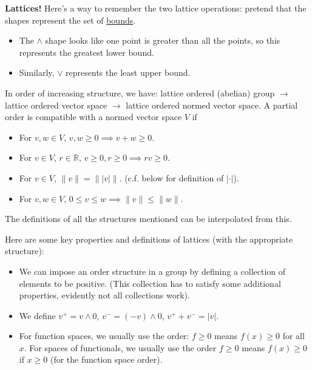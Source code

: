 \documentclass[12pt, letterpaper]{article}
\newcommand{\bR}{{\mathbb R}}
\begin{document}
\pagestyle{fancy}

\textbf{Lattices!} Here's a way to remember the two lattice operations: pretend that the shapes represent the set of \underline{bounds}.
\begin{itemize}
    \item
    The $\wedge$ shape looks like one point is greater than all the points, so this represents the greatest lower bound.

    \item
    Similarly, $\vee$ represents the least upper bound.

\end{itemize}
In order of increasing structure, we have: lattice ordered (abelian) group $ \rightarrow $ lattice ordered vector space $ \rightarrow $ lattice ordered normed vector space. A partial order is compatible with a normed vector space $V$ if
\begin{itemize}
    \item
    For $v,w \in V$, $v, w \geq 0 \implies v + w \geq 0$.
    
    \item
    For $v \in V$, $r \in \bR$, $v \geq 0, r \geq 0 \implies rv \geq 0$.

    \item
    For $v \in V$, $\|v\| = \| |v| \|$. (c.f. below for definition of $|\cdot|$).

    \item
    For $v,w \in V$, $0 \leq v \leq w \implies \|v\| \leq \|w\|$.
\end{itemize}
The definitions of all the structures mentioned can be interpolated from this.

Here are some key properties and definitions of lattices (with the appropriate structure):
\begin{itemize}
    \item
    We can impose an order structure in a group by defining a collection of elements to be positive. (This collection has to satisfy some additional properties, evidently not all collections work).

    \item
    We define $v^+ = v \wedge 0$, $v^- = (-v) \wedge 0$, $v^+ + v^- = |v|$.

    \item
    For function spaces, we usually use the order: $f \geq 0$ means $f(x) \geq 0$ for all $x$. For spaces of functionals, we usually use the order $f \geq 0$ means $f(x) \geq 0$ if $x \geq 0$ (for the function space order).
\end{itemize}
\end{document}
